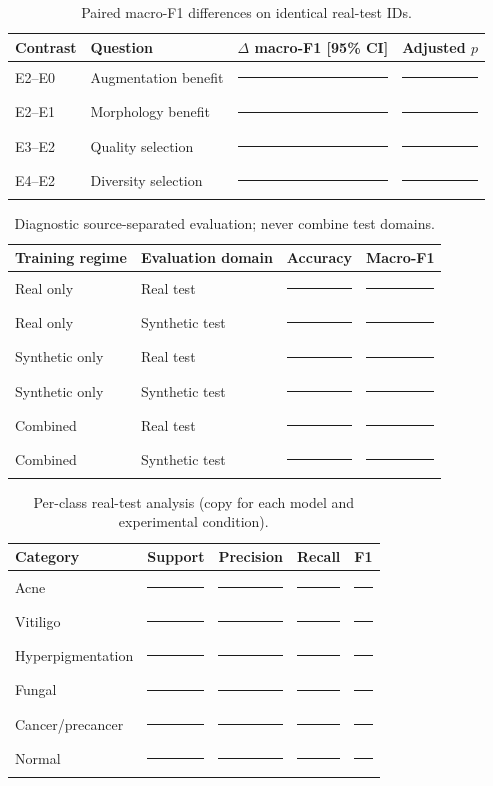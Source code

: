 \documentclass[11pt,a4paper]{article}
\newcommand{\blank}{\rule{0.72cm}{0.32pt}}
\begin{document}
\begin{table}[ht]\centering\small\caption{Paired macro-F1 differences on identical real-test IDs.}
\begin{tabularx}{\linewidth}{lXrr}\toprule Contrast & Question & $\Delta$ macro-F1 [95\% CI] & Adjusted $p$\\\midrule
E2--E0 & Augmentation benefit & \blank & \blank\\
E2--E1 & Morphology benefit & \blank & \blank\\
E3--E2 & Quality selection & \blank & \blank\\
E4--E2 & Diversity selection & \blank & \blank\\\bottomrule\end{tabularx}\end{table}

\begin{table}[ht]\centering\small\caption{Diagnostic source-separated evaluation; never combine test domains.}
\begin{tabularx}{\linewidth}{lXrr}\toprule Training regime & Evaluation domain & Accuracy & Macro-F1\\\midrule
Real only & Real test & \blank & \blank\\
Real only & Synthetic test & \blank & \blank\\
Synthetic only & Real test & \blank & \blank\\
Synthetic only & Synthetic test & \blank & \blank\\
Combined & Real test & \blank & \blank\\
Combined & Synthetic test & \blank & \blank\\\bottomrule\end{tabularx}\end{table}

\begin{table}[ht]\centering\small\caption{Per-class real-test analysis (copy for each model and experimental condition).}
\begin{tabularx}{\linewidth}{Xrrrr}\toprule Category & Support & Precision & Recall & F1\\\midrule
Acne & \blank & \blank & \blank & \blank\\
Vitiligo & \blank & \blank & \blank & \blank\\
Hyperpigmentation & \blank & \blank & \blank & \blank\\
Fungal & \blank & \blank & \blank & \blank\\
Cancer/precancer & \blank & \blank & \blank & \blank\\
Normal & \blank & \blank & \blank & \blank\\\bottomrule\end{tabularx}\end{table}
\end{document}
